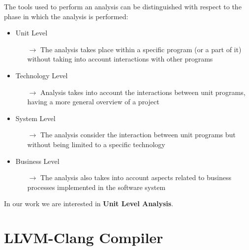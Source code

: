 The tools used to perform an analysis can be distinguished with respect to the phase in which the analysis is performed:

\begin{itemize}
	\item Unit Level
	\begin{itemize}
		\item[$\rightarrow$] The analysis takes place within a specific program (or a part of it) without taking into account interactions with other programs
	\end{itemize}
	\item Technology Level
	\begin{itemize}
		\item[$\rightarrow$] Analysis takes into account the interactions between unit programs, having a more general overview of a project
	\end{itemize}
	\item System Level
	\begin{itemize}
		\item[$\rightarrow$] The analysis consider the interaction between unit programs but without being limited to a specific technology
	\end{itemize}
	\item Business Level
	\begin{itemize}
		\item[$\rightarrow$] The analysis also takes into account aspects related to business processes implemented in the software system
	\end{itemize}
\end{itemize}

In our work we are interested in \textbf{Unit Level Analysis}.
\pagebreak

\section{LLVM-Clang Compiler}

